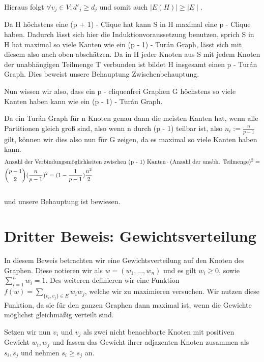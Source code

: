 \documentclass[12pt, a4paper]{article}
\begin{document}
Hieraus folgt $\forall v_j \in V: d'_j \ge d_j$ und somit auch $\mid E(H) \mid \ge \mid E \mid$.

Da H höchstens eine (p + 1) - Clique hat kann S in H maximal eine p - Clique haben. Dadurch lässt sich hier die Induktionvoraussetzung benutzen, sprich S in H hat maximal so viele Kanten wie ein (p - 1) - Turán Graph, lässt sich mit diesem also nach oben abschätzen. Da in H jeder Knoten aus S mit jedem Knoten der unabhängigen Teilmenge T verbunden ist bildet H insgesamt einen p - Turán Graph. Dies beweist unsere Behauptung Zwischenbehauptung.

Nun wissen wir also, dass ein p - cliquenfrei Graphen G höchstens so viele Kanten haben kann wie ein (p - 1) - Turán Graph.

Da ein Turán Graph für n Knoten genau dann die meisten Kanten hat, wenn alle Partitionen gleich groß sind, also wenn n durch (p - 1) teilbar ist, also $n_i := \frac{n}{p-1}$ gilt, können wir dies also nun für G zeigen, da es maximal so viele Kanten haben kann.
\begin{gather}
\begin{split}&\text{Anzahl der Verbindungsmöglichkeiten zwischen (p - 1) Kanten} \cdot ( \text{Anzahl der unabh. Teilmenge} )^2 = \\ &{ p - 1 \choose 2 } ( \frac{n}{p-1} )^2 = (1 - \frac{1}{p - 1}) \frac{n^2}{2}\end{split}\notag\\\begin{split}\end{split}\notag
\end{gather}
und unsere Behauptung ist bewiesen.


\section{Dritter Beweis: Gewichtsverteilung}
\label{proof/third::doc}\label{proof/third:dritter-beweis-gewichtsverteilung}
In diesem Beweis betrachten wir eine Gewichtsverteilung auf den Knoten des Graphen. Diese notieren wir als $w = (w_1,...,w_n)$ und es gilt $w_i \ge 0$, sowie $\sum^n_{i=1}w_i = 1$. Des weiteren definieren wir eine Funktion $f(w) = \sum_{ \{v_i, v_j\} \in E} w_i w_j$, welche wir zu maximieren versuchen. Wir nutzen diese Funktion, da sie für den ganzen Graphen dann maximal ist, wenn die Gewichte möglichst gleichmäßig verteilt sind.

Setzen wir nun $v_i$ und $v_j$ als zwei nicht benachbarte Knoten mit positiven Gewicht $w_i, w_j$ und fassen das Gewicht ihrer adjazenten Knoten zusammen als $s_i, s_j$ und nehmen $s_i \ge s_j$ an.
\end{document}
